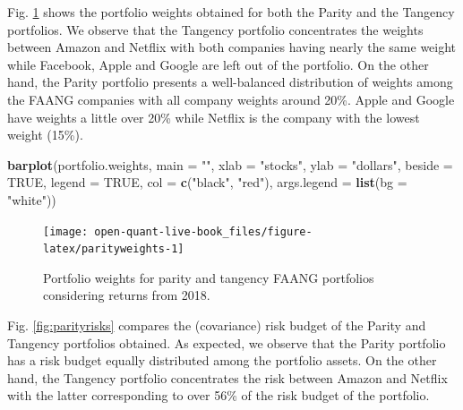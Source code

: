 \documentclass[]{book}
\newenvironment{Shaded}{\begin{snugshade}}{\end{snugshade}}
\newcommand{\KeywordTok}[1]{\textcolor[rgb]{0.13,0.29,0.53}{\textbf{#1}}}
\newcommand{\DataTypeTok}[1]{\textcolor[rgb]{0.13,0.29,0.53}{#1}}
\newcommand{\StringTok}[1]{\textcolor[rgb]{0.31,0.60,0.02}{#1}}
\newcommand{\OtherTok}[1]{\textcolor[rgb]{0.56,0.35,0.01}{#1}}
\newcommand{\NormalTok}[1]{#1}
\theoremstyle{definition}
\theoremstyle{definition}
\theoremstyle{definition}
\theoremstyle{remark}
\begin{document}
Fig. \ref{fig:parityweights} shows the portfolio weights obtained for
both the Parity and the Tangency portfolios. We observe that the
Tangency portfolio concentrates the weights between Amazon and Netflix
with both companies having nearly the same weight while Facebook, Apple
and Google are left out of the portfolio. On the other hand, the Parity
portfolio presents a well-balanced distribution of weights among the
FAANG companies with all company weights around 20\%. Apple and Google
have weights a little over 20\% while Netflix is the company with the
lowest weight (15\%).

\begin{Shaded}
\begin{Highlighting}[]
\KeywordTok{barplot}\NormalTok{(portfolio.weights, }\DataTypeTok{main =} \StringTok{""}\NormalTok{, }\DataTypeTok{xlab =} \StringTok{"stocks"}\NormalTok{, }\DataTypeTok{ylab =} \StringTok{"dollars"}\NormalTok{, }
  \DataTypeTok{beside =} \OtherTok{TRUE}\NormalTok{, }\DataTypeTok{legend =} \OtherTok{TRUE}\NormalTok{, }\DataTypeTok{col =} \KeywordTok{c}\NormalTok{(}\StringTok{"black"}\NormalTok{, }\StringTok{"red"}\NormalTok{), }
  \DataTypeTok{args.legend =} \KeywordTok{list}\NormalTok{(}\DataTypeTok{bg =} \StringTok{"white"}\NormalTok{))}
\end{Highlighting}
\end{Shaded}

\begin{figure}[H]

{\centering \texttt{[image: open-quant-live-book\_files/figure-latex/parityweights-1]} 

}

\caption{Portfolio weights for parity and tangency FAANG portfolios considering returns from 2018.}\label{fig:parityweights}
\end{figure}

Fig. \ref{fig:parityrisks} compares the (covariance) risk budget of the
Parity and Tangency portfolios obtained. As expected, we observe that
the Parity portfolio has a risk budget equally distributed among the
portfolio assets. On the other hand, the Tangency portfolio concentrates
the risk between Amazon and Netflix with the latter corresponding to
over 56\% of the risk budget of the portfolio.
\end{document}
